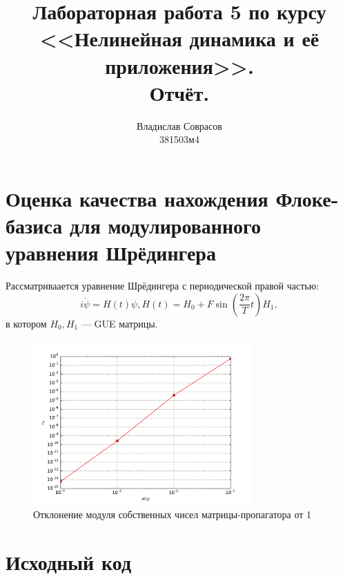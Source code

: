 \documentclass[a4paper]{article}
\begin{document}
\title{Лабораторная работа 5 по курсу <<Нелинейная динамика и её приложения>>. \\Отчёт.}
\author{Владислав Соврасов\\ 381503м4}
\date{}
\maketitle

\section{Оценка качества нахождения Флоке-базиса для модулированного уравнения Шрёдингера}
Рассматриваается уравнение Шрёдингера с периодической правой частью:
\begin{displaymath}
	i \dot \psi = H(t)\psi, H(t)=H_0 + F \sin(\frac{2\pi}{T} t)H_1,
\end{displaymath}
в котором \(H_0, H_1\) --- GUE матрицы.

\begin{figure}[H]
	\center
	\includegraphics[width=0.75\textwidth]{../pictures/lab5_eigvals_error.pdf}
	\caption{Отклонение модуля собственных чисел матрицы-пропагатора от 1}
	\label{fig:eigvals_error}
\end{figure}

\section{Исходный код}

\end{document}
